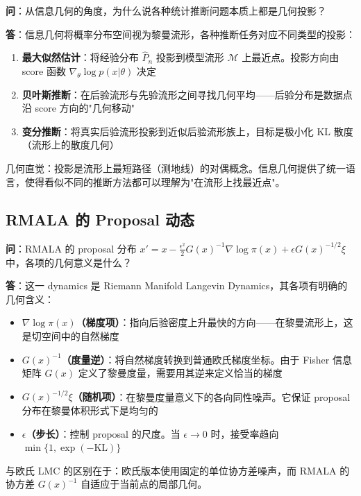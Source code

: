 \textbf{问}：从信息几何的角度，为什么说各种统计推断问题本质上都是几何投影？

\textbf{答}：信息几何将概率分布空间视为黎曼流形，各种推断任务对应不同类型的投影：

\begin{enumerate}
    \item \textbf{最大似然估计}：将经验分布 $\hat{P}_n$ 投影到模型流形 $\mathcal{M}$ 上最近点。投影方向由 score 函数 $\nabla_\theta \log p(x|\theta)$ 决定
    \item \textbf{贝叶斯推断}：在后验流形与先验流形之间寻找几何平均——后验分布是数据点沿 score 方向的"几何移动"
    \item \textbf{变分推断}：将真实后验流形投影到近似后验流形族上，目标是极小化 KL 散度（流形上的散度几何）
\end{enumerate}

几何直觉：投影是流形上最短路径（测地线）的对偶概念。信息几何提供了统一语言，使得看似不同的推断方法都可以理解为"在流形上找最近点"。

\subsection{RMALA 的 Proposal 动态}\label{sec:qa-rmala-proposal-dynamics}

\textbf{问}：RMALA 的 proposal 分布 $x' = x - \frac{\epsilon^2}{2} G(x)^{-1} \nabla \log \pi(x) + \epsilon G(x)^{-1/2} \xi$ 中，各项的几何意义是什么？

\textbf{答}：这一 dynamics 是 Riemann Manifold Langevin Dynamics，其各项有明确的几何含义：

\begin{itemize}
    \item \textbf{$\nabla \log \pi(x)$（梯度项）}：指向后验密度上升最快的方向——在黎曼流形上，这是切空间中的自然梯度
    \item \textbf{$G(x)^{-1}$（度量逆）}：将自然梯度转换到普通欧氏梯度坐标。由于 Fisher 信息矩阵 $G(x)$ 定义了黎曼度量，需要用其逆来定义恰当的梯度
    \item \textbf{$G(x)^{-1/2} \xi$（随机项）}：在黎曼度量意义下的各向同性噪声。它保证 proposal 分布在黎曼体积形式下是均匀的
    \item \textbf{$\epsilon$（步长）}：控制 proposal 的尺度。当 $\epsilon \to 0$ 时，接受率趋向 $\min\{1, \exp(-\text{KL})\}$
\end{itemize}

与欧氏 LMC 的区别在于：欧氏版本使用固定的单位协方差噪声，而 RMALA 的协方差 $G(x)^{-1}$ 自适应于当前点的局部几何。


